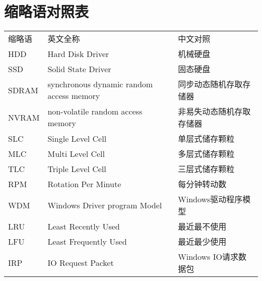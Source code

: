 
\chapter*{缩略语对照表}

\begin{tabular}{lll}
  缩略语 & 英文全称 & 中文对照\\
  HDD   & Hard Disk Driver & 机械硬盘\\
  SSD   & Solid State Driver & 固态硬盘\\
  SDRAM & synchronous dynamic random access memory & 同步动态随机存取存储器\\
  NVRAM & non-volatile random access memory & 非易失动态随机存取存储器\\
  SLC   & Single Level Cell & 单层式储存颗粒\\
  MLC   & Multi Level Cell & 多层式储存颗粒\\
  TLC   & Triple Level Cell & 三层式储存颗粒\\
  RPM   & Rotation Per Minute & 每分钟转动数\\
  WDM   & Windows Driver program Model & Windows驱动程序模型\\
  LRU   & Least Recently Used & 最近最不使用\\
  LFU   & Least Frequently Used & 最近最少使用\\
  IRP   & IO Request Packet & Windows IO请求数据包 \\
\end{tabular}
